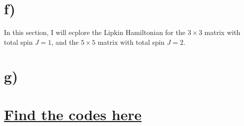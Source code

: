 \documentclass[11pt, letterpaper, titlepage]{article}
\begin{document}
\section{f)}
In this section, I will ecplore the Lipkin Hamiltonian for the \(3\times 3\) matrix with total spin \(J=1\), and the \(5 \times 5\) matrix with total spin \(J=2\). 


\section{g)}

\section{\href{https://github.com/hishemok/FYS5419/tree/master/Project_1}{Find the codes here}}
\end{document}
